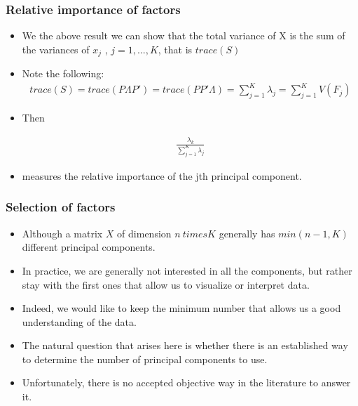 \documentclass[
  shownotes,
  xcolor={svgnames},
  hyperref={colorlinks,citecolor=DarkBlue,linkcolor=DarkRed,urlcolor=DarkBlue}
  , aspectratio=169]{beamer}
\begin{document}
\begin{frame}
\frametitle{Relative importance of factors}
\begin{itemize}

\item We the above result we can show that the total variance of X is the sum of the variances of $x_j$ , $j = 1, ..., K$, that is $trace(S)$
\medskip
\item Note the following:
\begin{align}
trace(S) = trace(P \Lambda P')= trace(PP' \Lambda ) = \sum_{j=1}^K \lambda_j= \sum_{j=1}^K V(F_j)
\end{align}
\item Then

\begin{align}
\frac{\lambda_k}{\sum_{j=1}^K \lambda_j}
\end{align}

\item measures the relative importance of the jth principal component.
\end{itemize}
\end{frame}

\begin{frame}
\frametitle{Selection of factors}

\begin{itemize}

\item Although a matrix  $X$ of dimension $ n \ times K $ generally has $min (n-1, K)$ different principal components.
\medskip
\item  In practice, we are generally not interested in all the components, but rather stay with the first ones that allow us to visualize or interpret data. 
\medskip
\item Indeed, we would like to keep the minimum number that allows us a good understanding of the data. 
\medskip
\item  The natural question that arises here is whether there is an established way to determine the number of principal components to use. 
\medskip
\item Unfortunately, there is no accepted objective way in the literature to answer it. 

\end{itemize}
\end{frame}
\end{document}

